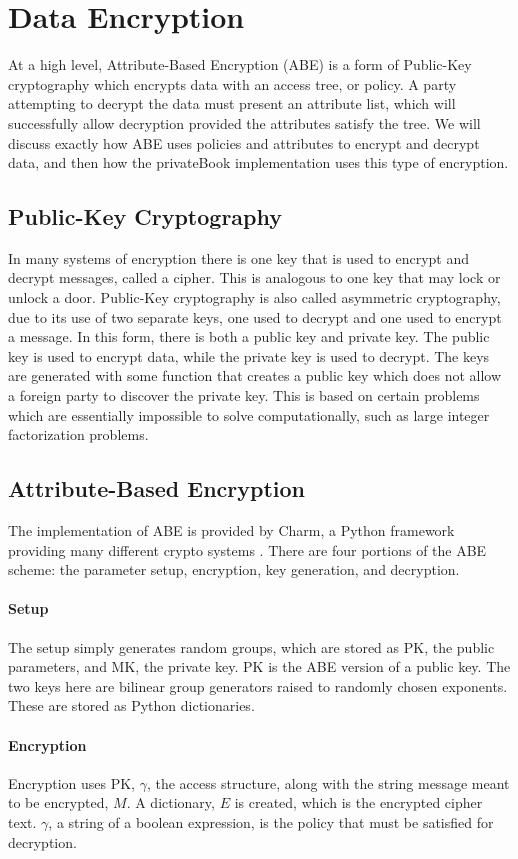 \documentclass[12pt]{article}
\begin{document}
\section{Data Encryption}
At a high level, Attribute-Based Encryption (ABE) is a form of Public-Key cryptography which encrypts data with an access tree, or policy. A party attempting to decrypt the data must present an attribute list, which will successfully allow decryption provided the attributes satisfy the tree. We will discuss exactly how ABE uses policies and attributes to encrypt and decrypt data, and then how the privateBook implementation uses this type of encryption.

\subsection{Public-Key Cryptography}
In many systems of encryption there is one key that is used to encrypt and decrypt messages, called a cipher. This is analogous to one key that may lock or unlock a door. Public-Key cryptography is also called asymmetric cryptography, due to its use of two separate keys, one used to decrypt and one used to encrypt a message. In this form, there is both a public key and private key. The public key is used to encrypt data, while the private key is used to decrypt. The keys are generated with some function that creates a public key which does not allow a foreign party to discover the private key. This is based on certain problems which are essentially impossible to solve computationally, such as large integer factorization problems. 

\subsection{Attribute-Based Encryption}
The implementation of ABE is provided by Charm, a Python framework providing many different crypto systems \cite{charm}. There are four portions of the ABE scheme: the parameter setup, encryption, key generation, and decryption. 
\paragraph{Setup}
The setup simply generates random groups, which are stored as PK, the public parameters, and MK, the private key. PK is the ABE version of a public key. The two keys here are bilinear group generators raised to randomly chosen exponents. These are stored as Python dictionaries.
\paragraph{Encryption}
Encryption uses PK, $\gamma$, the access structure, along with the string message meant to be encrypted, $M$. A dictionary, $E$ is created, which is the encrypted cipher text. $\gamma$, a string of a boolean expression, is the policy that must be satisfied for decryption.
\end{document}
